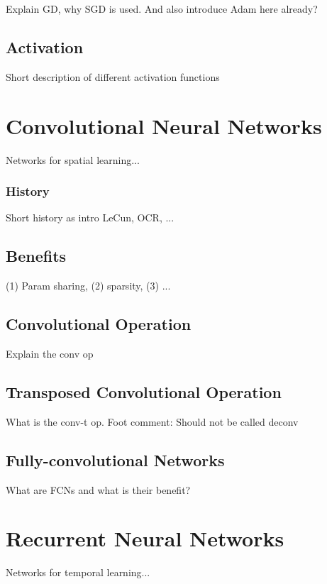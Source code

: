 Explain GD, why SGD is used. And also introduce Adam here already?


\subsection{Activation}

Short description of different activation functions


\section{Convolutional Neural Networks}

Networks for spatial learning...

\subsubsection{History}
Short history as intro LeCun, OCR, ...

\subsection{Benefits}

(1) Param sharing, (2) sparsity, (3) ...

\subsection{Convolutional Operation}

Explain the conv op

\subsection{Transposed Convolutional Operation}

What is the conv-t op. Foot comment: Should not be called deconv

\subsection{Fully-convolutional Networks}

What are FCNs and what is their benefit?


\section{Recurrent Neural Networks}

Networks for temporal learning...

